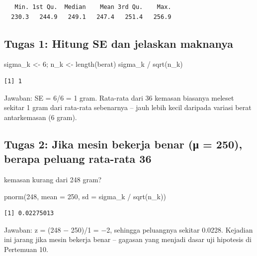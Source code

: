 \documentclass[
  indonesian,
  letterpaper,
]{book}
\newenvironment{Shaded}{\begin{snugshade}}{\end{snugshade}}
\newcommand{\AttributeTok}[1]{\textcolor[rgb]{0.40,0.45,0.13}{#1}}
\newcommand{\DecValTok}[1]{\textcolor[rgb]{0.68,0.00,0.00}{#1}}
\newcommand{\FunctionTok}[1]{\textcolor[rgb]{0.28,0.35,0.67}{#1}}
\newcommand{\NormalTok}[1]{\textcolor[rgb]{0.00,0.23,0.31}{#1}}
\newcommand{\OtherTok}[1]{\textcolor[rgb]{0.00,0.23,0.31}{#1}}
\newcommand{\SpecialCharTok}[1]{\textcolor[rgb]{0.37,0.37,0.37}{#1}}
\begin{document}
\begin{verbatim}
   Min. 1st Qu.  Median    Mean 3rd Qu.    Max. 
  230.3   244.9   249.1   247.4   251.4   256.9 
\end{verbatim}

\subsection{Tugas 1: Hitung SE dan jelaskan
maknanya}\label{tugas-1-hitung-se-dan-jelaskan-maknanya}

\begin{Shaded}
\begin{Highlighting}[]
\NormalTok{sigma\_k }\OtherTok{\textless{}{-}} \DecValTok{6}\NormalTok{; n\_k }\OtherTok{\textless{}{-}} \FunctionTok{length}\NormalTok{(berat)}
\NormalTok{sigma\_k }\SpecialCharTok{/} \FunctionTok{sqrt}\NormalTok{(n\_k)}
\end{Highlighting}
\end{Shaded}

\begin{verbatim}
[1] 1
\end{verbatim}

Jawaban: SE = 6/6 = 1 gram. Rata-rata dari 36 kemasan biasanya meleset
sekitar 1 gram dari rata-rata sebenarnya -- jauh lebih kecil daripada
variasi berat antarkemasan (6 gram).

\subsection{Tugas 2: Jika mesin bekerja benar (μ = 250), berapa peluang
rata-rata
36}\label{tugas-2-jika-mesin-bekerja-benar-ux3bc-250-berapa-peluang-rata-rata-36}

kemasan kurang dari 248 gram?

\begin{Shaded}
\begin{Highlighting}[]
\FunctionTok{pnorm}\NormalTok{(}\DecValTok{248}\NormalTok{, }\AttributeTok{mean =} \DecValTok{250}\NormalTok{, }\AttributeTok{sd =}\NormalTok{ sigma\_k }\SpecialCharTok{/} \FunctionTok{sqrt}\NormalTok{(n\_k))}
\end{Highlighting}
\end{Shaded}

\begin{verbatim}
[1] 0.02275013
\end{verbatim}

Jawaban: z = (248 − 250)/1 = −2, sehingga peluangnya sekitar 0.0228.
Kejadian ini jarang jika mesin bekerja benar -- gagasan yang menjadi
dasar uji hipotesis di Pertemuan 10.
\end{document}
